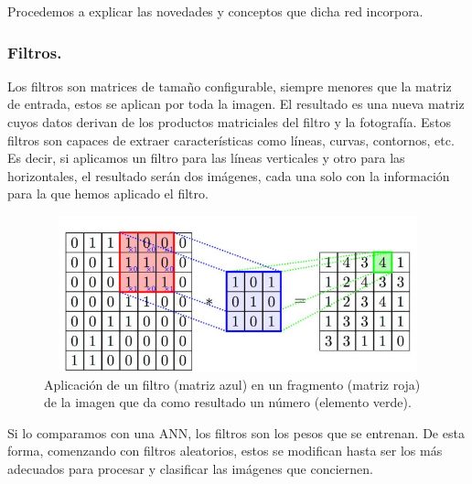 \documentclass[a4paper,11pt]{article}
\begin{document}
\noindent
Procedemos a explicar las novedades y conceptos que dicha red incorpora.

\subsubsection{Filtros.}
Los filtros son matrices de tamaño configurable, siempre menores que la matriz de entrada, estos se aplican por toda la imagen. El resultado es una nueva matriz cuyos datos derivan de los productos matriciales del filtro y la fotografía. Estos filtros son capaces de extraer características como líneas, curvas, contornos, etc.  \\

\noindent
Es decir, si aplicamos un filtro para las líneas verticales y otro para las horizontales, el resultado serán dos imágenes, cada una solo con la información para la que hemos aplicado el filtro.
\begin{figure}[H]
\centering
\includegraphics[width=12.0cm, height=4.5cm]{Annotation 2020-04-13 191448.png}
\caption{Aplicación de un filtro (matriz azul) en un fragmento (matriz roja) de la imagen que da como resultado un número (elemento verde).}
\end{figure}
\noindent
Si lo comparamos con una ANN, los filtros son los pesos que se entrenan. De esta forma, comenzando con filtros aleatorios, estos se modifican hasta ser los más adecuados para procesar y clasificar las imágenes que conciernen.\\
\end{document}
